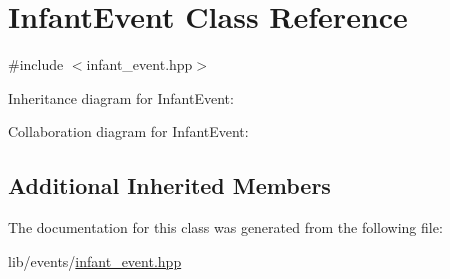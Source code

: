 \hypertarget{class_infant_event}{}\section{Infant\+Event Class Reference}
\label{class_infant_event}


{\ttfamily \#include $<$infant\+\_\+event.\+hpp$>$}



Inheritance diagram for Infant\+Event\+:


Collaboration diagram for Infant\+Event\+:
\subsection*{Additional Inherited Members}


The documentation for this class was generated from the following file\+:\begin{DoxyCompactItemize}
\item 
lib/events/\hyperlink{infant__event_8hpp}{infant\+\_\+event.\+hpp}\end{DoxyCompactItemize}
